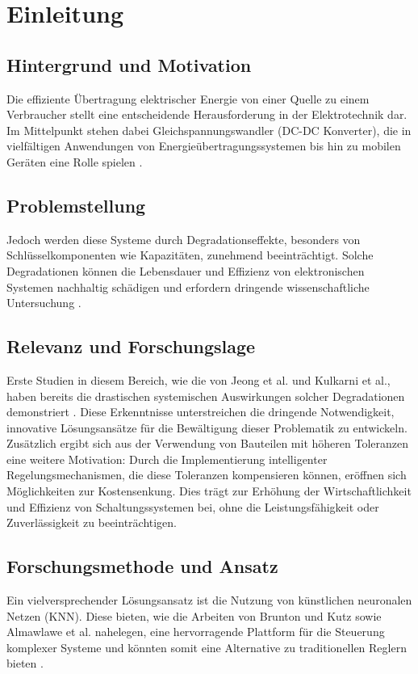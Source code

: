 \chapter{Einleitung}
\section{Hintergrund und Motivation}
Die effiziente Übertragung elektrischer Energie von einer Quelle zu einem Verbraucher stellt eine entscheidende Herausforderung in der Elektrotechnik dar. Im Mittelpunkt stehen dabei Gleichspannungswandler (DC-DC Konverter), die in vielfältigen Anwendungen von Energieübertragungssystemen bis hin zu mobilen Geräten eine Rolle spielen \cite{wensdesign2022}.

\section{Problemstellung}
Jedoch werden diese Systeme durch Degradationseffekte, besonders von Schlüsselkomponenten wie Kapazitäten, zunehmend beeinträchtigt. Solche Degradationen können die Lebensdauer und Effizienz von elektronischen Systemen nachhaltig schädigen und erfordern dringende wissenschaftliche Untersuchung \cite{jeong2023degradation}.

\section{Relevanz und Forschungslage}
Erste Studien in diesem Bereich, wie die von Jeong et al. und Kulkarni et al., haben bereits die drastischen systemischen Auswirkungen solcher Degradationen demonstriert \cite{kulkarni_model-based_2023}. Diese Erkenntnisse unterstreichen die dringende Notwendigkeit, innovative Lösungsansätze für die Bewältigung dieser Problematik zu entwickeln. Zusätzlich ergibt sich aus der Verwendung von Bauteilen mit höheren Toleranzen eine weitere Motivation: Durch die Implementierung intelligenter Regelungsmechanismen, die diese Toleranzen kompensieren können, eröffnen sich Möglichkeiten zur Kostensenkung. Dies trägt zur Erhöhung der Wirtschaftlichkeit und Effizienz von Schaltungssystemen bei, ohne die Leistungsfähigkeit oder Zuverlässigkeit zu beeinträchtigen.

\section{Forschungsmethode und Ansatz}
Ein vielversprechender Lösungsansatz ist die Nutzung von künstlichen neuronalen Netzen (KNN). Diese bieten, wie die Arbeiten von Brunton und Kutz sowie Almawlawe et al. nahelegen, eine hervorragende Plattform für die Steuerung komplexer Systeme und könnten somit eine Alternative zu traditionellen Reglern bieten \cite{brunton2019data} \cite{Almawlawe2023}.

